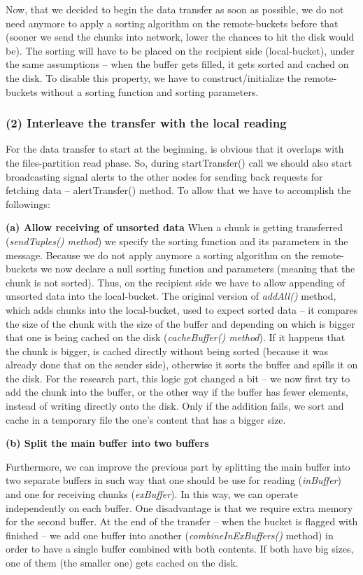 Now, that we decided to begin the data transfer as soon as possible, we do not need anymore to apply a sorting algorithm on the remote-buckets before that (sooner we send the chunks into network, lower the chances to hit the disk would be). The sorting will have to be placed on the recipient side (local-bucket), under the same assumptions -- when the buffer gets filled, it gets sorted and cached on the disk. To disable this property, we have to construct/initialize the remote-buckets without a sorting function and sorting parameters.

% 
\subsubsection*{(2) Interleave the transfer with the local reading}

For the data transfer to start at the beginning, is obvious that it overlaps with the files-partition read phase. So, during startTransfer() call we should also start broadcasting signal alerts to the other nodes for sending back requests for fetching data -- alertTransfer() method. To allow that we have to accomplish the followings:

\textbf{(a) Allow receiving of unsorted data}
When a chunk is getting transferred (\textit{sendTuples() method}) we specify the sorting function and its parameters in the message. Because we do not apply anymore a sorting algorithm on the remote-buckets we now declare a null sorting function and parameters (meaning that the chunk is not sorted). Thus, on the recipient side we have to allow appending of unsorted data into the local-bucket. The original version of \textit{addAll()} method, which adds chunks into the local-bucket, used to expect sorted data -- it compares the size of the chunk with the size of the buffer and depending on which is bigger that one is being cached on the disk (\textit{cacheBuffer() method}). If it happens that the chunk is bigger, is cached directly without being sorted (because it was already done that on the sender side), otherwise it sorts the buffer and spills it on the disk. For the research part, this logic got changed a bit -- we now first try to add the chunk into the buffer, or the other way if the buffer has fewer elements, instead of writing directly onto the disk. Only if the addition fails, we sort and cache in a temporary file the one's content that has a bigger size.

\textbf{(b) Split the main buffer into two buffers}

Furthermore, we can improve the previous part by splitting the main buffer into two separate buffers in such way that one should be use for reading (\textit{inBuffer}) and one for receiving chunks (\textit{exBuffer}). In this way, we can operate independently on each buffer. One disadvantage is that we require extra memory for the second buffer. At the end of the transfer -- when the bucket is flagged with finished -- we add one buffer into another (\textit{combineInExBuffers()} method) in order to have a single buffer combined with both contents. If both have big sizes, one of them (the smaller one) gets cached on the disk.

